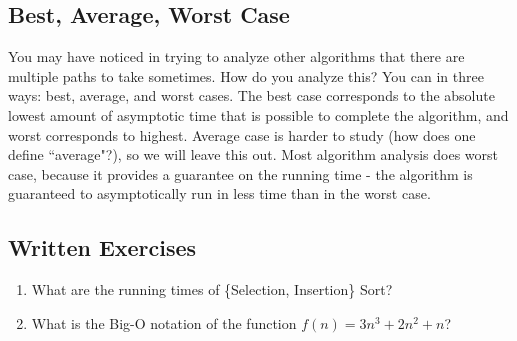 \subsection{Best, Average, Worst Case}
You may have noticed in trying to analyze other algorithms that there are multiple paths to take sometimes. How do you analyze this? You can in three ways: best, average, and worst cases. The best case corresponds to the absolute lowest amount of asymptotic time that is possible to complete the algorithm, and worst corresponds to highest. Average case is harder to study (how does one define ``average"?), so we will leave this out. Most algorithm analysis does worst case, because it provides a guarantee on the running time - the algorithm is guaranteed to asymptotically run in less time than in the worst case.

\subsection{Written Exercises}
\setcounter{counter}{1}
\begin{enumerate}[label={\arabic{counter}\addtocounter{counter}{1}}.]
\item What are the running times of \{Selection, Insertion\} Sort?
\item What is the Big-O notation of the function $f(n) = 3n^3 + 2n^2 + n$?
\end{enumerate}